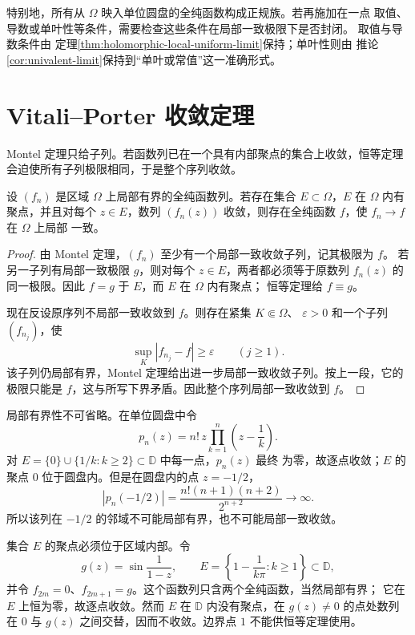 特别地，所有从 $\Omega$ 映入单位圆盘的全纯函数构成正规族。若再施加在一点
取值、导数或单叶性等条件，需要检查这些条件在局部一致极限下是否封闭。
取值与导数条件由
定理\ref{thm:holomorphic-local-uniform-limit}保持；单叶性则由
推论\ref{cor:univalent-limit}保持到“单叶或常值”这一准确形式。

\section{Vitali--Porter 收敛定理}

Montel 定理只给子列。若函数列已在一个具有内部聚点的集合上收敛，恒等定理
会迫使所有子列极限相同，于是整个序列收敛。

\begin{theorem}\label{thm:vitali-porter}
设 $(f_n)$ 是区域 $\Omega$ 上局部有界的全纯函数列。若存在集合
$E\subset\Omega$，$E$ 在 $\Omega$ 内有聚点，并且对每个 $z\in E$，数列
$(f_n(z))$ 收敛，则存在全纯函数 $f$，使 $f_n\to f$ 在 $\Omega$ 上局部
一致。
\end{theorem}

\begin{proof}
由 Montel 定理，$(f_n)$ 至少有一个局部一致收敛子列，记其极限为 $f$。
若另一子列有局部一致极限 $g$，则对每个 $z\in E$，两者都必须等于原数列
$f_n(z)$ 的同一极限。因此 $f=g$ 于 $E$，而 $E$ 在 $\Omega$ 内有聚点；
恒等定理给 $f\equiv g$。

现在反设原序列不局部一致收敛到 $f$。则存在紧集 $K\Subset\Omega$、
$\varepsilon>0$ 和一个子列 $(f_{n_j})$，使
\[
 \sup_K|f_{n_j}-f|\ge\varepsilon\qquad(j\ge1).
\]
该子列仍局部有界，Montel 定理给出进一步局部一致收敛子列。按上一段，它的
极限只能是 $f$，这与所写下界矛盾。因此整个序列局部一致收敛到 $f$。
\end{proof}

局部有界性不可省略。在单位圆盘中令
\[
 p_n(z)=n!\, z\prod_{k=1}^{n}\left(z-\frac1k\right).
\]
对 $E=\{0\}\cup\{1/k:k\ge2\}\subset\mathbb D$ 中每一点，$p_n(z)$ 最终
为零，故逐点收敛；$E$ 的聚点 $0$ 位于圆盘内。但是在圆盘内的点
$z=-1/2$，
\[
 |p_n(-1/2)|
 =\frac{n!(n+1)(n+2)}{2^{n+2}}\longrightarrow\infty.
\]
所以该列在 $-1/2$ 的邻域不可能局部有界，也不可能局部一致收敛。

集合 $E$ 的聚点必须位于区域内部。令
\[
 g(z)=\sin\frac{1}{1-z},\qquad
 E=\left\{1-\frac{1}{k\pi}:k\ge1\right\}\subset\mathbb D,
\]
并令 $f_{2m}=0$、$f_{2m+1}=g$。这个函数列只含两个全纯函数，当然局部有界；
它在 $E$ 上恒为零，故逐点收敛。然而 $E$ 在 $\mathbb D$ 内没有聚点，在
$g(z)\ne0$ 的点处数列在 $0$ 与 $g(z)$ 之间交替，因而不收敛。边界点 $1$
不能供恒等定理使用。

